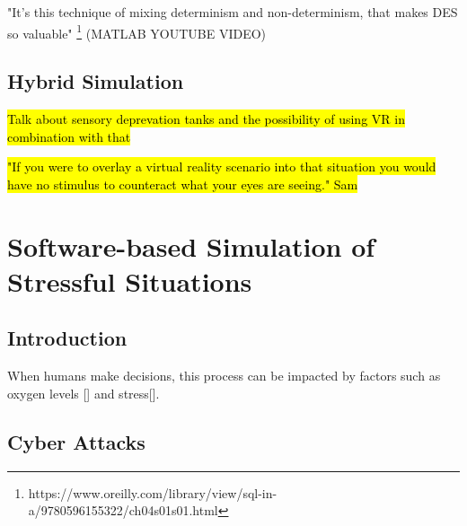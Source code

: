 \documentclass{article}
\begin{document}
"It's this technique of mixing determinism and non-determinism, that makes DES so valuable" \footnote{https://www.oreilly.com/library/view/sql-in-a/9780596155322/ch04s01s01.html} (MATLAB YOUTUBE VIDEO)


\subsection{Hybrid Simulation}


\hl{Talk about sensory deprevation tanks and the possibility of using VR in combination with that}

\hl{"If you were to overlay a virtual reality scenario into that situation you would have no stimulus to counteract what your eyes are seeing." Sam}


\section{Software-based Simulation of Stressful Situations}

\subsection{Introduction}

When humans make decisions, this process can be impacted by factors such as oxygen levels [] and stress[].





\subsection{Cyber Attacks}
\end{document}
